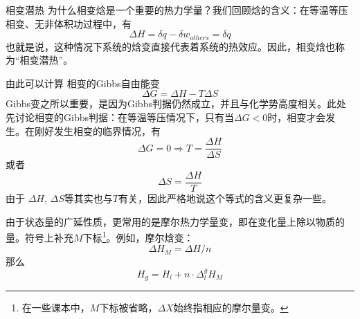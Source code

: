 \begin{example}{相变潜热}
为什么相变焓是一个重要的热力学量？我们回顾焓的含义：在等温等压相变、无非体积功过程中，有
$$
\Delta H = \delta q - \delta w_{others} = \delta q
$$
也就是说，这种情况下系统的焓变直接代表着系统的热效应。因此，相变焓也称为“相变潜热”。
\end{example}

由此可以计算 相变的Gibbs自由能变
$$
\Delta G = \Delta H - T \Delta S
$$
Gibbs变之所以重要，是因为Gibbs判据仍然成立，并且与化学势高度相关。此处先讨论相变的Gibbs判据：在等温等压情况下，只有当$\Delta G<0$时，相变才会发生。在刚好发生相变的临界情况，有
$$
\Delta G = 0 \Rightarrow T = \frac{\Delta H}{\Delta S}
$$
或者
$$
\Delta S = \frac{\Delta H}{T}
$$
由于 $\Delta H$, $\Delta S$等其实也与$T$有关，因此严格地说这个等式的含义更复杂一些。

由于状态量的广延性质，更常用的是摩尔热力学量变，即在变化量上除以物质的量。符号上补充$M$下标\footnote{在一些课本中，$M$下标被省略，$\Delta X$始终指相应的摩尔量变。}。例如，摩尔焓变：
$$
\Delta H_M = \Delta H / n
$$
那么
$$
H_g = H_l + n \cdot \Delta^g_l H_M
$$
